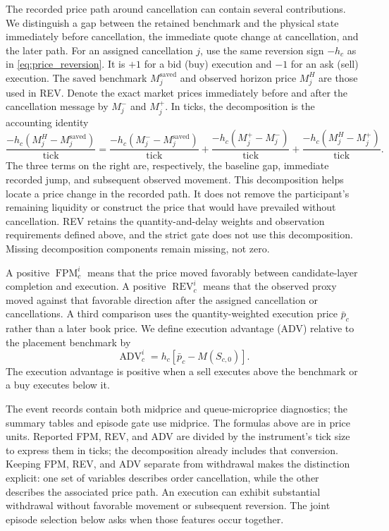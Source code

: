 \documentclass[11pt]{article}
\begin{document}
The recorded price path around cancellation can contain several contributions. We distinguish a gap between the retained benchmark and the physical state immediately before cancellation, the immediate quote change at cancellation, and the later path. For an assigned cancellation $j$, use the same reversion sign $-h_c$ as in \cref{eq:price_reversion}. It is $+1$ for a bid (buy) execution and $-1$ for an ask (sell) execution. The saved benchmark $M_j^{\mathrm{saved}}$ and observed horizon price $M_j^H$ are those used in REV. Denote the exact market prices immediately before and after the cancellation message by $M_j^{-}$ and $M_j^{+}$. In ticks, the decomposition is the accounting identity
\begin{equation}
\frac{-h_c(M_j^H-M_j^{\mathrm{saved}})}{\mathrm{tick}}
=\frac{-h_c(M_j^{-}-M_j^{\mathrm{saved}})}{\mathrm{tick}}
+\frac{-h_c(M_j^{+}-M_j^{-})}{\mathrm{tick}}
+\frac{-h_c(M_j^H-M_j^{+})}{\mathrm{tick}}.
\label{eq:observed_rev_decomposition}
\end{equation}
The three terms on the right are, respectively, the baseline gap, immediate recorded jump, and subsequent observed movement. This decomposition helps locate a price change in the recorded path. It does not remove the participant's remaining liquidity or construct the price that would have prevailed without cancellation. REV retains the quantity-and-delay weights and observation requirements defined above, and the strict gate does not use this decomposition. Missing decomposition components remain missing, not zero.

A positive $\operatorname{FPM}^{i}_{c}$ means that the price moved favorably between candidate-layer completion and execution. A positive $\operatorname{REV}^{i}_{c}$ means that the observed proxy moved against that favorable direction after the assigned cancellation or cancellations. A third comparison uses the quantity-weighted execution price $\bar p_c$ rather than a later book price. We define execution advantage (ADV) relative to the placement benchmark by
\begin{equation}
    \operatorname{ADV}^{i}_{c}
    =
    h_c\left[\bar p_c-M(S_{c,0})\right].
    \label{eq:execution_advantage}
\end{equation}
The execution advantage is positive when a sell executes above the benchmark or a buy executes below it.

The event records contain both midprice and queue-microprice diagnostics; the summary tables and episode gate use midprice. The formulas above are in price units. Reported FPM, REV, and ADV are divided by the instrument's tick size to express them in ticks; the decomposition already includes that conversion. Keeping FPM, REV, and ADV separate from withdrawal makes the distinction explicit: one set of variables describes order cancellation, while the other describes the associated price path. An execution can exhibit substantial withdrawal without favorable movement or subsequent reversion. The joint episode selection below asks when those features occur together.
\end{document}
